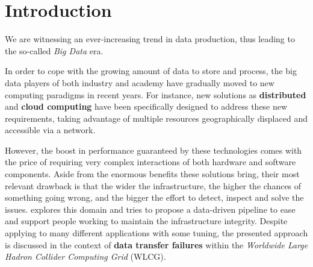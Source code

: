 
\chapter{Introduction}

We are witnessing an ever-increasing trend in data production, thus leading to the so-called \emph{Big Data} era. 

In order to cope with the growing amount of data to store and process, the big data players of both industry and academy have gradually moved to new computing paradigms in recent years. 
For instance, new solutions as \textbf{distributed} and \textbf{cloud computing}  have been specifically designed to address these new requirements, taking advantage of multiple resources geographically displaced and accessible via a network.

However, the boost in performance guaranteed by these technologies comes with the price of requiring very complex interactions of both hardware and software components. 
Aside from the enormous benefits these solutions bring, their most relevant drawback is that the wider the infrastructure, the higher the chances of something going wrong, and the bigger the effort to detect, inspect and solve the issues.
 explores this domain and tries to propose a data-driven pipeline to ease and support people working to maintain the infrastructure integrity.
Despite applying to many different applications with some tuning, the presented approach is discussed in the context of \textbf{data transfer failures} within the \emph{Worldwide Large Hadron Collider Computing Grid} (WLCG).

